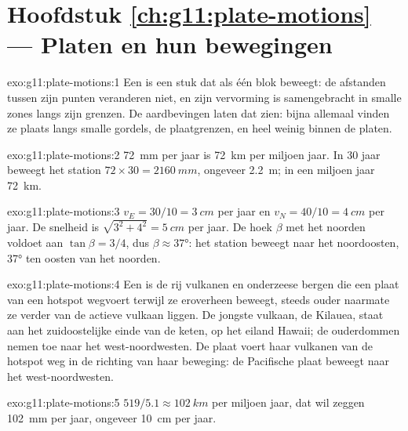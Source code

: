 \section*{Hoofdstuk \ref{ch:g11:plate-motions} --- Platen en hun bewegingen}

\begin{solution}{exo:g11:plate-motions:1}
Een  is een stuk  dat als één blok beweegt: de
afstanden tussen zijn punten veranderen niet, en zijn vervorming is samengebracht
in smalle zones langs zijn grenzen. De aardbevingen laten dat zien: bijna allemaal
vinden ze plaats langs smalle gordels, de plaatgrenzen, en heel weinig binnen de
platen.
\end{solution}

\begin{solution}{exo:g11:plate-motions:2}
\qty{72}{mm} per jaar is \qty{72}{km} per miljoen jaar. In 30 jaar beweegt het
station $72 \times 30 = \qty{2160}{mm}$, ongeveer \qty{2.2}{m}; in een miljoen jaar
\qty{72}{km}.
\end{solution}

\begin{solution}{exo:g11:plate-motions:3}
$v_E = 30/10 = \qty{3}{cm}$ per jaar en $v_N = 40/10 = \qty{4}{cm}$ per jaar. De
snelheid is $\sqrt{3^2 + 4^2} = \qty{5}{cm}$ per jaar. De hoek $\beta$ met het
noorden voldoet aan $\tan\beta = 3/4$, dus $\beta \approx \ang{37}$: het station
beweegt naar het noordoosten, \ang{37} ten oosten van het noorden.
\end{solution}

\begin{solution}{exo:g11:plate-motions:4}
Een  is de rij vulkanen en onderzeese bergen die een plaat van een
hotspot wegvoert terwijl ze eroverheen beweegt, steeds ouder naarmate ze verder
van de actieve vulkaan liggen. De jongste vulkaan, de Kilauea, staat aan het
zuidoostelijke einde van de keten, op het eiland Hawaii; de ouderdommen nemen toe
naar het west-noordwesten. De plaat voert haar vulkanen van de hotspot weg in de
richting van haar beweging: de Pacifische plaat beweegt naar het
west-noordwesten.
\end{solution}

\begin{solution}{exo:g11:plate-motions:5}
$519/5.1 \approx \qty{102}{km}$ per miljoen jaar, dat wil zeggen \qty{102}{mm} per
jaar, ongeveer \qty{10}{cm} per jaar.
\end{solution}


